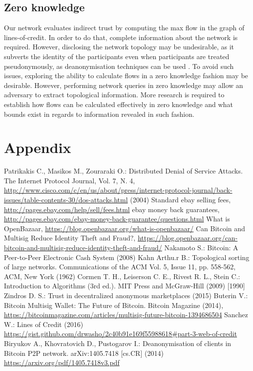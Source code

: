 \documentclass[11pt]{llncs}
\begin{document}
  \subsection{Zero knowledge}
     Our network evaluates indirect trust by computing the max flow in the graph of lines-of-credit. In order to do that,
     complete information about the network is required. However, disclosing the network topology may be undesirable, as it
     subverts the identity of the participants even when participants are treated pseudonymously, as deanonymisation
     techniques can be used \cite{deanonymisation}. To avoid such issues, exploring the ability to calculate flows in a zero
     knowledge fashion may be desirable. However, performing network queries in zero knowledge may allow an adversary to
     extract topological information. More research is required to establish how flows can be calculated effectively in zero
     knowledge and what bounds exist in regards to information revealed in such fashion.

  \section*{Appendix}

  \begin{thebibliography}{20}
     Patrikakis C., Masikos M., Zouraraki O.: Distributed Denial of Service Attacks. The Internet Protocol Journal, Vol. 7,
     N. 4,
     \url{http://www.cisco.com/c/en/us/about/press/internet-protocol-journal/back-issues/table-contents-30/dos-attacks.html}
     (2004)
     Standard ebay selling fees, \url{http://pages.ebay.com/help/sell/fees.html}
     ebay money back guarantees, \url{http://pages.ebay.com/ebay-money-back-guarantee/questions.html}
     What is OpenBazaar, \url{https://blog.openbazaar.org/what-is-openbazaar/}
     Can Bitcoin and Multisig Reduce Identity Theft and Fraud?,
     \url{https://blog.openbazaar.org/can-bitcoin-and-multisig-reduce-identity-theft-and-fraud/}
     Nakamoto S.: Bitcoin: A Peer-to-Peer Electronic Cash System (2008)
     Kahn Arthu.r B.: Topological sorting of large networks. Communications of the ACM Vol. 5, Issue 11, pp. 558-562, ACM,
     New York (1962)
     Cormen T. H., Leiserson C. E., Rivest R. L., Stein C.: Introduction to Algorithms (3rd ed.). MIT Press and McGraw-Hill
     (2009) [1990]
     Zindros D. S.: Trust in decentralized anonymous marketplaces (2015)
     Buterin V.: Bitcoin Multisig Wallet: The Future of Bitcoin. Bitcoin Magazine (2014),
     \url{https://bitcoinmagazine.com/articles/multisig-future-bitcoin-1394686504}
     Sanchez W.: Lines of Credit (2016) \url{https://gist.github.com/drwasho/2c40b91e169f55988618#part-3-web-of-credit}
     Biryukov A., Khovratovich D., Pustogarov I.: Deanonymisation of clients in Bitcoin P2P network. arXiv:1405.7418 [cs.CR]
     (2014)
     \url{https://arxiv.org/pdf/1405.7418v3.pdf}
  \end{thebibliography}
\end{document}
